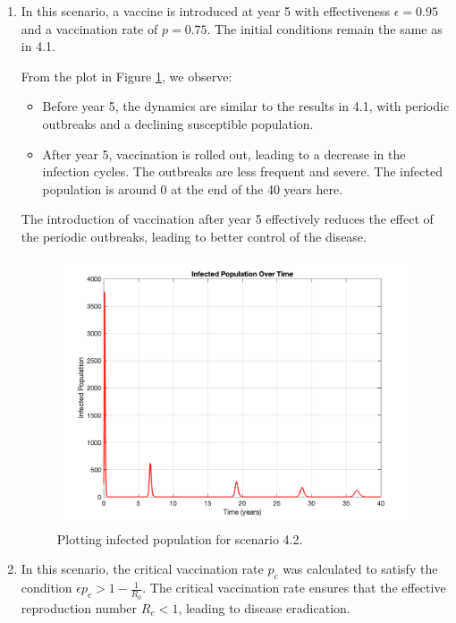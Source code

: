 \documentclass[12pt]{article}
\begin{document}
\begin{enumerate}
\begin{enumerate}
  \item In this scenario, a vaccine is introduced at year 5 with effectiveness \( \epsilon = 0.95 \) and a vaccination rate of \( p = 0.75 \). The initial conditions remain the same as in 4.1.

  From the plot in Figure \ref{fig:figure42}, we observe:
  \begin{itemize}
      \item Before year 5, the dynamics are similar to the results in 4.1, with periodic outbreaks and a declining susceptible population.
      \item After year 5, vaccination is rolled out, leading to a decrease in the infection cycles. The outbreaks are less frequent and severe. The infected population is around 0 at the end of the 40 years here.
  \end{itemize}
  
  The introduction of vaccination after year 5 effectively reduces the effect of the periodic outbreaks, leading to better control of the disease.

  \begin{figure}[H]
    \centering
    \includegraphics[width=\textwidth]{Figures/figure42.png}
    \caption{Plotting infected population for scenario 4.2.}
    \label{fig:figure42}
  \end{figure}

  \item In this scenario, the critical vaccination rate \( p_c \) was calculated to satisfy the condition \( \epsilon p_c > 1 - \frac{1}{R_0} \). The critical vaccination rate ensures that the effective reproduction number \( R_e < 1 \), leading to disease eradication.


\end{enumerate}
\end{enumerate}
\end{document}
